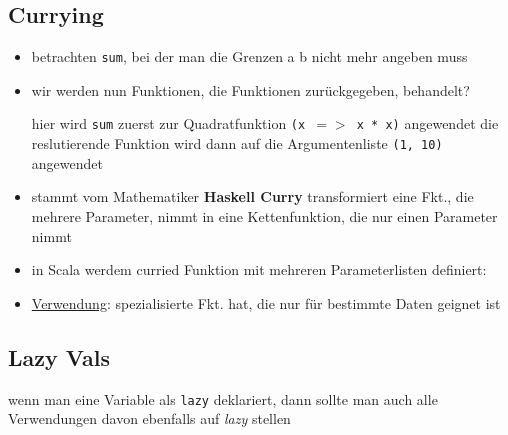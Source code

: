 \subsection{Currying}
\begin{itemize}
  \item betrachten \texttt{sum}, bei der man die Grenzen a \und b nicht mehr
  angeben muss
  
  
  
  \item wir werden nun Funktionen, die Funktionen zurückgegeben,
  behandelt?
  
  
  
  hier wird \texttt{sum} zuerst zur Quadratfunktion \texttt{(x $=>$ x * x)}
  angewendet \und die reslutierende Funktion wird dann auf die Argumentenliste
  \texttt{(1, 10)} angewendet 
  \item stammt vom Mathematiker \textbf{Haskell Curry} \und transformiert
  eine Fkt., die mehrere Parameter, nimmt in eine Kettenfunktion, die 
  nur einen Parameter nimmt
  \item in Scala werdem curried Funktion mit mehreren Parameterlisten
  definiert:
  
  
  
  \item \uline{Verwendung}: spezialisierte Fkt. hat, die nur für 
  bestimmte Daten geignet ist
\end{itemize}


\subsection{Lazy Vals}
wenn man eine Variable als \texttt{lazy} deklariert, dann sollte
man auch alle Verwendungen davon ebenfalls auf \textit{lazy} stellen 

 
\pagebreak


